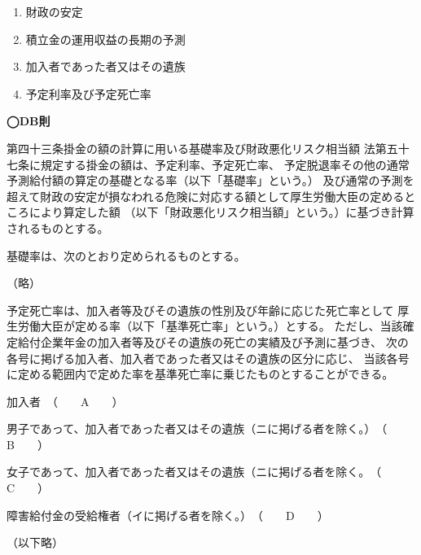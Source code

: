 \begin{answerbox}
    \begin{enumerate}[A: ]
    \item 財政の安定
    \item 積立金の運用収益の長期の予測
    \item 加入者であった者又はその遺族
    \item 予定利率及び予定死亡率
  \end{enumerate}
\end{answerbox}


\begin{fillblank}[数理人試験 H25 問題1(3)a〜d]
  \noindent \textbf{◯DB則}
  \begin{lawstructure}
    \begin{lawarticle}{第四十三条}{掛金の額の計算に用いる基礎率及び財政悪化リスク相当額}
      法第五十七条に規定する掛金の額は、予定利率、予定死亡率、
      予定脱退率その他の通常予測給付額の算定の基礎となる率（以下「基礎率」という。）
      及び通常の予測を超えて財政の安定が損なわれる危険に対応する額として厚生労働大臣の定めるところにより算定した額
      （以下「財政悪化リスク相当額」という。）に基づき計算されるものとする。

      基礎率は、次のとおり定められるものとする。

      （略）

予定死亡率は、加入者等及びその遺族の性別及び年齢に応じた死亡率として
厚生労働大臣が定める率（以下「基準死亡率」という。）とする。
ただし、当該確定給付企業年金の加入者等及びその遺族の死亡の実績及び予測に基づき、
次の各号に掲げる加入者、加入者であった者又はその遺族の区分に応じ、
当該各号に定める範囲内で定めた率を基準死亡率に乗じたものとすることができる。

加入者　（　　A　　）

男子であって、加入者であった者又はその遺族（ニに掲げる者を除く。）　（　　B　　）

女子であって、加入者であった者又はその遺族（ニに掲げる者を除く。　（　　C　　）

障害給付金の受給権者（イに掲げる者を除く。）　（　　D　　）

（以下略）

    \end{lawarticle}
  \end{lawstructure}
\end{fillblank}

